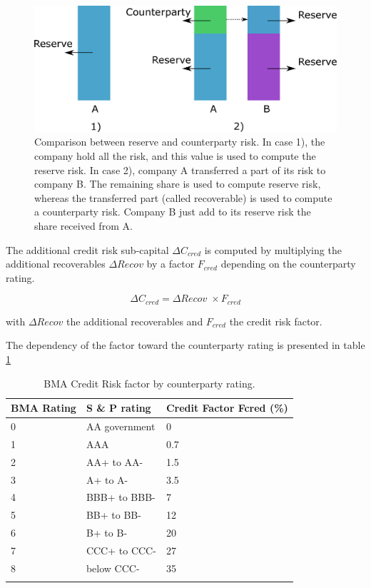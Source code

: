 \begin{figure}
  \includegraphics[width=\linewidth]{images/part1/reserve_vs_couterparty.eps}
  \caption{Comparison between reserve and counterparty risk. In case 1), the company hold all the risk, and this value is used to compute the reserve risk. In case 2), company A transferred a part of its risk to company B. The remaining share is used to compute reserve risk, whereas the transferred part (called recoverable) is used to compute a counterparty risk. Company B just add to its reserve risk the share received from A.}
  \label{fig:RESVSCOUNTER}
\end{figure}

The additional credit risk sub-capital $\Delta C_{cred}$ is computed by multiplying the additional recoverables $\Delta Recov$ by a factor $F_{cred}$ depending on the counterparty rating. 

\begin{equation}
	\Delta C_{cred} = \Delta Recov \; \times F_{cred}
\end{equation}

with $\Delta Recov$ the additional recoverables and $F_{cred}$ the credit risk factor.

The dependency of the factor toward the counterparty rating is presented in table \ref{t:BMA_CREDIT_FACTOR}

\begin{table}[h!]
\centering
\begin{tabular}{|l|l|l|}
\hline
   \textbf{BMA Rating} & \textbf{S \& P rating} & \textbf{Credit Factor F{cred} (\%)}  \\ \hline \hline
   0 & AA government & 0 \\ \hline
   1 & AAA          & 0.7  \\ \hline
   2 & AA+ to AA-   & 1.5 \\ \hline
   3 & A+ to A-     & 3.5 \\ \hline
   4 & BBB+ to BBB- & 7  \\ \hline
   5 & BB+ to BB-   & 12  \\ \hline
   6 & B+ to B-     & 20  \\ \hline
   7 & CCC+ to CCC- & 27  \\ \hline
   8 &below CCC-    & 35  \\ \hline
   \label{t:BMA_CREDIT_FACTOR}
\end{tabular}
   \caption{BMA Credit Risk factor by counterparty rating.}
\end{table}


